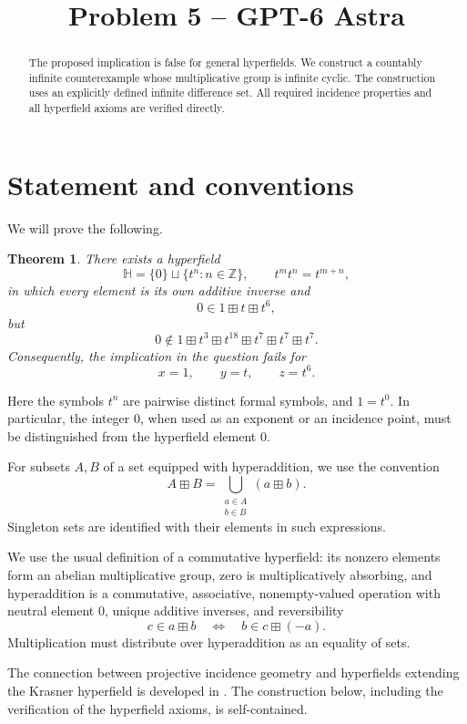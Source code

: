 \documentclass[11pt]{article}
\title{Problem 5 -- GPT-6 Astra}
\author{}
\date{}
\newcommand{\ZZ}{\mathbb{Z}}
\newcommand{\HH}{\mathbb{H}}
\newtheorem{theorem}{Theorem}
\begin{document}
\maketitle

\begin{abstract}
The proposed implication is false for general hyperfields. We construct a
countably infinite counterexample whose multiplicative group is infinite
cyclic. The construction uses an explicitly defined infinite difference set.
All required incidence properties and all hyperfield axioms are verified
directly.
\end{abstract}

\section{Statement and conventions}

We will prove the following.

\begin{theorem}\label{thm:main}
There exists a hyperfield
\[
    \HH=\{0\}\sqcup\{t^n:n\in\ZZ\},
    \qquad t^m t^n=t^{m+n},
\]
in which every element is its own additive inverse and
\[
    0\in 1\boxplus t\boxplus t^6,
\]
but
\[
    0\notin
    1\boxplus t^3\boxplus t^{18}
      \boxplus t^7\boxplus t^7\boxplus t^7.
\]
Consequently, the implication in the question fails for
\[
    x=1,\qquad y=t,\qquad z=t^6.
\]
\end{theorem}

Here the symbols \(t^n\) are pairwise distinct formal symbols, and \(1=t^0\).
In particular, the integer \(0\), when used as an exponent or an incidence
point, must be distinguished from the hyperfield element \(0\).

For subsets \(A,B\) of a set equipped with hyperaddition, we use the convention
\[
    A\boxplus B
    =\bigcup_{\substack{a\in A\\ b\in B}}(a\boxplus b).
\]
Singleton sets are identified with their elements in such expressions.

We use the usual definition of a commutative hyperfield: its nonzero elements
form an abelian multiplicative group, zero is multiplicatively absorbing,
and hyperaddition is a commutative, associative, nonempty-valued operation
with neutral element \(0\), unique additive inverses, and reversibility
\[
    c\in a\boxplus b
    \quad\Longleftrightarrow\quad
    b\in c\boxplus(-a).
\]
Multiplication must distribute over hyperaddition as an equality of sets.

The connection between projective incidence geometry and hyperfields
extending the Krasner hyperfield is developed in
\cite[Sections~3--4]{CC}. The construction below, including the verification
of the hyperfield axioms, is self-contained.
\end{document}
